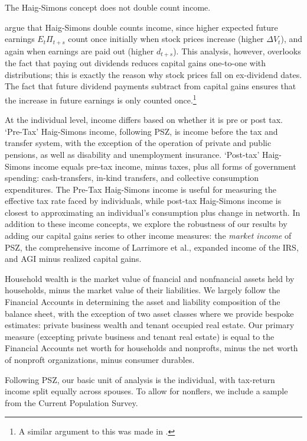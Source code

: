 \documentclass[12pt]{article}
\begin{document}
\begin{remark} \label{remark:doublec} The Haig-Simons concept does not double count income. \end{remark} 
\citet{CanberraGroup2001,splinter2025distribution} argue that Haig-Simons double counts income, since higher expected future earnings $E_t \Pi_{t+s}$ count once initially when stock prices increase (higher $\Delta V_t$), and again when earnings are paid out (higher $d_{t+s}$). This analysis, however, overlooks the fact that paying out dividends reduces capital gains one-to-one with distributions; this is exactly the reason why stock prices fall on ex-dividend dates. The fact that future dividend payments subtract from capital gains ensures that the increase in future earnings is only counted once.\footnote{A similar argument to this was made in  \citet{larrimore2021recent}.} 


At the individual level, income differs based on whether it is pre or post tax. `Pre-Tax' Haig-Simons income, following PSZ, is income before the tax and transfer system, with the exception of the operation of private and public pensions, as well as disability and unemployment insurance. `Post-tax' Haig-Simons income equals pre-tax income, minus taxes, plus all forms of government spending: cash-transfers, in-kind transfers, and collective consumption expenditures. The Pre-Tax Haig-Simons income is useful for measuring the effective tax rate faced by individuals, while post-tax Haig-Simons income is closest to approximating an individual's consumption plus change in networth. In addition to these income concepts, we explore the robustness of our results by adding our capital gains series to other income measures: the \textit{market income} of PSZ, the comprehensive income of Larrimore et al., expanded income of the IRS, and AGI minus realized capital gains. 

Household wealth is the market value of fnancial and nonfnancial assets held by households, minus the market value of their liabilities. We largely follow the Financial Accounts in determining the asset and liability composition of the balance sheet, with the exception of two asset classes where we provide bespoke estimates: private business wealth and tenant occupied real estate. Our primary measure (excepting private business and tenant real estate) is equal to the Financial Accounts net worth for households and nonprofts, minus the net worth of nonproft organizations, minus consumer durables.

Following PSZ, our basic unit of analysis is the individual, with tax-return income split equally across spouses. To allow for nonflers, we include a sample from the Current Population Survey.
\end{document}
